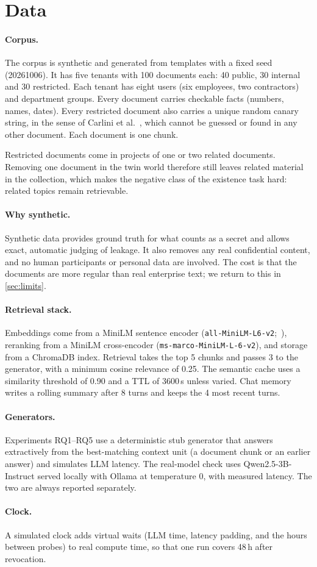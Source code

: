 \section{Data}
\label{sec:data}

\paragraph{Corpus.}
The corpus is synthetic and generated from templates with a fixed seed (20261006). It has five tenants with 100 documents each: 40 public, 30 internal and 30 restricted. Each tenant has eight users (six employees, two contractors) and department groups. Every document carries checkable facts (numbers, names, dates). Every restricted document also carries a unique random canary string, in the sense of Carlini et al.~\cite{carlini2019secret}, which cannot be guessed or found in any other document. Each document is one chunk.

Restricted documents come in projects of one or two related documents. Removing one document in the twin world therefore still leaves related material in the collection, which makes the negative class of the existence task hard: related topics remain retrievable.

\paragraph{Why synthetic.}
Synthetic data provides ground truth for what counts as a secret and allows exact, automatic judging of leakage. It also removes any real confidential content, and no human participants or personal data are involved. The cost is that the documents are more regular than real enterprise text; we return to this in \cref{sec:limits}.

\paragraph{Retrieval stack.}
Embeddings come from a MiniLM sentence encoder (\texttt{all-MiniLM-L6-v2};~\cite{reimers2019sbert,wang2020minilm}), reranking from a MiniLM cross-encoder (\texttt{ms-marco-MiniLM-L-6-v2}), and storage from a ChromaDB index. Retrieval takes the top 5 chunks and passes 3 to the generator, with a minimum cosine relevance of 0.25. The semantic cache uses a similarity threshold of 0.90 and a TTL of 3600\,s unless varied. Chat memory writes a rolling summary after 8 turns and keeps the 4 most recent turns.

\paragraph{Generators.}
Experiments RQ1--RQ5 use a deterministic stub generator that answers extractively from the best-matching context unit (a document chunk or an earlier answer) and simulates LLM latency. The real-model check uses Qwen2.5-3B-Instruct served locally with Ollama at temperature 0, with measured latency. The two are always reported separately.

\paragraph{Clock.}
A simulated clock adds virtual waits (LLM time, latency padding, and the hours between probes) to real compute time, so that one run covers 48\,h after revocation.
